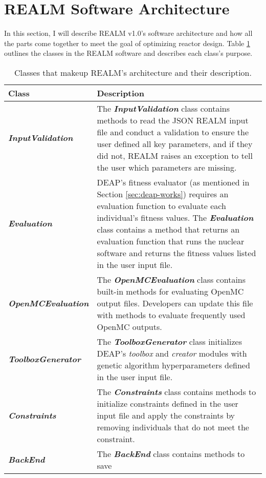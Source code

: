 \section{REALM Software Architecture}
In this section, I will describe \gls{REALM} v1.0's software architecture and 
how all the parts come together to meet the goal of optimizing reactor 
design. 
Table \ref{tab:realm-architecture} outlines the classes in the REALM software 
and describes each class's purpose.
\begin{table}[]
    \centering
    \onehalfspacing
    \caption{Classes that makeup REALM's architecture and their description. }
	\label{tab:realm-architecture}
    \small
    \begin{tabular}{l|p{}}
    \hline
    \textbf{Class} & \textbf{Description} \\ \hline
    \textbf{\textit{InputValidation}} & The \textbf{\textit{InputValidation}} class contains methods 
    to read the JSON \gls{REALM} input file and conduct a validation to 
    ensure the user defined all key parameters, and if they did not, \gls{REALM} 
    raises an exception to tell the user which parameters are missing. \\
    \hline
    \textbf{\textit{Evaluation}} & \gls{DEAP}'s fitness evaluator (as mentioned in Section 
    \ref{sec:deap-works}) requires an evaluation function to evaluate each 
    individual's fitness values. 
    The \textbf{\textit{Evaluation}} class contains a method that returns an evaluation 
    function that runs the nuclear software and returns the fitness values listed 
    in the user input file. \\
    \hline 
    \textbf{\textit{OpenMCEvaluation}} & The \textbf{\textit{OpenMCEvaluation}} class contains
    built-in methods for evaluating OpenMC output files. Developers can update 
    this file with methods to evaluate frequently used OpenMC outputs. \\
    \hline 
    \textbf{\textit{ToolboxGenerator}} & The \textbf{\textit{ToolboxGenerator}} class initializes
    DEAP's \textit{toolbox} and \textit{creator} modules with genetic algorithm 
    hyperparameters defined in the user input file.\\
    \hline
    \textbf{\textit{Constraints}} & The \textbf{\textit{Constraints}} class 
    contains methods to initialize constraints defined in the user input file 
    and apply the constraints by removing individuals that do not meet the 
    constraint.\\
    \hline 
    \textbf{\textit{BackEnd}} & The \textbf{\textit{BackEnd}} class contains methods to save 

\end{tabular}
\end{table}
